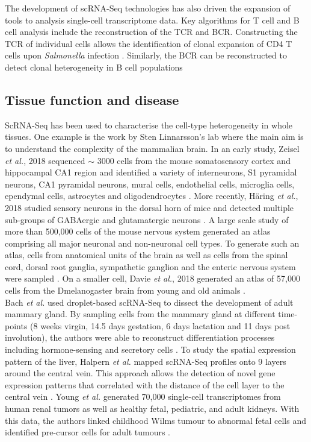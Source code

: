 The development of scRNA-Seq technologies has also driven the expansion of tools to analysis single-cell transcriptome data. Key algorithms for T cell and B cell analysis include the reconstruction of the TCR and \gls{BCR}. Constructing the TCR of individual cells allows the identification of clonal expansion of CD4\plus{} T cells upon \textit{Salmonella} infection \citep{Stubbington2016}. Similarly, the BCR can be reconstructed to detect clonal heterogeneity in B cell populations \citep{Canzar2017, Wu2018}

\subsection{Tissue function and disease}

ScRNA-Seq has been used to characterise the cell-type heterogeneity in whole tissues. One example is the work by Sten Linnarsson's lab where the main aim is to understand the complexity of the mammalian brain. In an early study, Zeisel \emph{et al.}, 2018 sequenced $\sim$ 3000 cells from the mouse somatosensory cortex and hippocampal CA1 region and identified a variety of interneurons, S1 pyramidal neurons, CA1 pyramidal neurons, mural cells, endothelial cells, microglia cells, ependymal cells, astrocytes and oligodendrocytes \citep{Zeisel2015}. More recently, H\"a{}ring \emph{et al.}, 2018 studied sensory neurons in the dorsal horn of mice and detected multiple sub-groups of GABAergic and glutamatergic neurons \citep{Haring2018}. A large scale study of more than 500,000 cells of the mouse nervous system generated an atlas comprising all major neuronal and non-neuronal cell types. To generate such an atlas, cells from anatomical units of the brain as well as cells from the spinal cord, dorsal root ganglia, sympathetic ganglion and the enteric nervous system were sampled \citep{Zeisel2018}. On a smaller cell, Davie \emph{et al.}, 2018 generated an atlas of 57,000 cells from the \gls{Dmelanogaster} brain from young and old animals \cite{Davie2018}.\\

Bach \emph{et al.} used droplet-based scRNA-Seq to dissect the development of adult mammary gland. By sampling cells from the mammary gland at different time-points (8 weeks virgin, 14.5 days gestation, 6 days lactation and 11 days post involution), the authors were able to reconstruct differentiation processes including hormone-sensing and secretory cells \citep{Bach2017}. To study the spatial expression pattern of the liver, Halpern \emph{et al.} mapped scRNA-Seq profiles onto 9 layers around the central vein. This approach allows the detection of novel gene expression patterns that correlated with the distance of the cell layer to the central vein \citep{Halpern2017}. Young \emph{et al.} generated 70,000 single-cell transcriptomes from human renal tumors as well as healthy fetal, pediatric, and adult kidneys. With this data, the authors linked childhood Wilms tumour to abnormal fetal cells and identified pre-cursor cells for adult tumours \citep{Young2018}. \\

